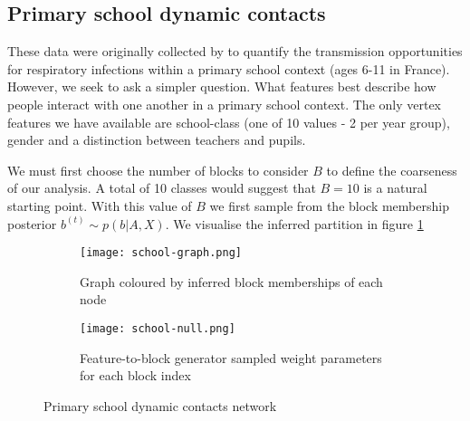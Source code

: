 \subsection{Primary school dynamic contacts}

These data were originally collected by \citet{schools} to quantify the transmission opportunities for respiratory infections within a primary school context (ages 6-11 in France). However, we seek to ask a simpler question. What features best describe how people interact with one another in a primary school context. The only vertex features we have available are school-class (one of 10 values - 2 per year group), gender and a distinction between teachers and pupils.

We must first choose the number of blocks to consider $B$ to define the coarseness of our analysis. A total of 10 classes would suggest that $B=10$ is a natural starting point. With this value of $B$ we first sample from the block membership posterior $b^{(t)} \sim p(b | A, X)$. We visualise the inferred partition in figure \ref{fig:school-graph}

\begin{figure}[!h]
	\centering
	\begin{subfigure}{0.45\linewidth}
		\centering
		\texttt{[image: school-graph.png]}
		\caption{Graph coloured by inferred block memberships of each node}
		\label{fig:school-graph}
	\end{subfigure}
	\hfill
	\begin{subfigure}{0.45\linewidth}
		\centering
		\texttt{[image: school-null.png]}
		\caption{Feature-to-block generator sampled weight parameters for each block index}
		\label{fig:school-null}
	\end{subfigure}
	\caption{Primary school dynamic contacts network \cite{schools}}
\end{figure}
